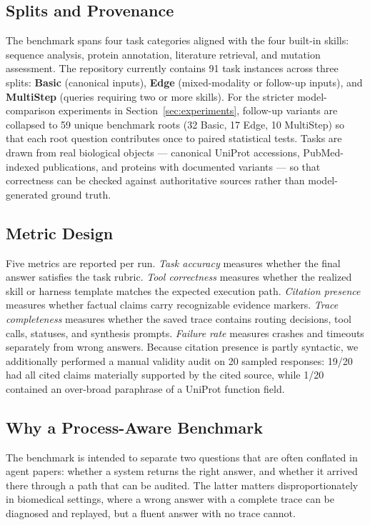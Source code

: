 \documentclass[11pt,letterpaper]{article}
\begin{document}
\subsection{Splits and Provenance}
The benchmark spans four task categories aligned with the four built-in skills: sequence analysis, protein annotation, literature retrieval, and mutation assessment. The repository currently contains 91 task instances across three splits: \textbf{Basic} (canonical inputs), \textbf{Edge} (mixed-modality or follow-up inputs), and \textbf{MultiStep} (queries requiring two or more skills). For the stricter model-comparison experiments in Section~\ref{sec:experiments}, follow-up variants are collapsed to 59 unique benchmark roots (32 Basic, 17 Edge, 10 MultiStep) so that each root question contributes once to paired statistical tests. Tasks are drawn from real biological objects --- canonical UniProt accessions, PubMed-indexed publications, and proteins with documented variants --- so that correctness can be checked against authoritative sources rather than model-generated ground truth.

\subsection{Metric Design}
Five metrics are reported per run. \emph{Task accuracy} measures whether the final answer satisfies the task rubric. \emph{Tool correctness} measures whether the realized skill or harness template matches the expected execution path. \emph{Citation presence} measures whether factual claims carry recognizable evidence markers. \emph{Trace completeness} measures whether the saved trace contains routing decisions, tool calls, statuses, and synthesis prompts. \emph{Failure rate} measures crashes and timeouts separately from wrong answers. Because citation presence is partly syntactic, we additionally performed a manual validity audit on 20 sampled responses: 19/20 had all cited claims materially supported by the cited source, while 1/20 contained an over-broad paraphrase of a UniProt function field.

\subsection{Why a Process-Aware Benchmark}
The benchmark is intended to separate two questions that are often conflated in agent papers: whether a system returns the right answer, and whether it arrived there through a path that can be audited. The latter matters disproportionately in biomedical settings, where a wrong answer with a complete trace can be diagnosed and replayed, but a fluent answer with no trace cannot.
\end{document}
